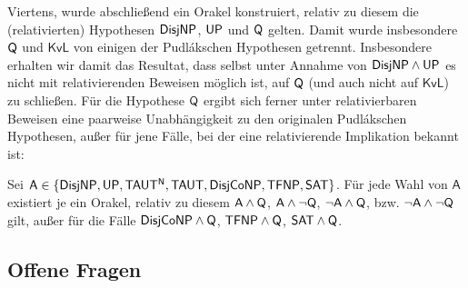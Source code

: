 Viertens, wurde abschließend ein Orakel konstruiert, relativ zu diesem die (relativierten) Hypothesen $\mathsf{DisjNP}$, $\mathsf{UP}$ und $\mathsf{Q}$ gelten.
Damit wurde insbesondere $\mathsf{Q}$ und $\mathsf{KvL}$ von einigen der Pudlákschen Hypothesen getrennt. Insbesondere erhalten wir damit das Resultat, dass selbst unter Annahme von $\mathsf{DisjNP}\land\mathsf{UP}$ es nicht mit relativierenden Beweisen möglich ist, auf $\mathsf{Q}$ (und auch nicht auf $\mathsf{KvL}$) zu schließen.
Für die Hypothese $\mathsf{Q}$ ergibt sich ferner unter relativierbaren Beweisen eine paarweise Unabhängigkeit zu den originalen Pudlákschen Hypothesen, außer für jene Fälle, bei der eine relativierende Implikation bekannt ist:

\begin{corollary}
    Sei $\mathsf A \in \{\mathsf{DisjNP}, \mathsf{UP}, \mathsf{TAUT^{N}}, \mathsf{TAUT}, \mathsf{DisjCoNP}, \mathsf{TFNP}, \mathsf{SAT}\}$.
    Für jede Wahl von $\mathsf A$ existiert je ein Orakel, relativ zu diesem $\mathsf A\land \mathsf{Q}$, $\mathsf A\land \neg\mathsf{Q}$, $\neg\mathsf A\land \mathsf{Q}$, bzw. $\neg\mathsf A\land\neg\mathsf{Q}$ gilt, außer für die Fälle $\mathsf{DisjCoNP}\land\mathsf{Q}$, $\mathsf{TFNP}\land\mathsf{Q}$, $\mathsf{SAT}\land\mathsf{Q}$.
\end{corollary}

\subsection*{Offene Fragen}

